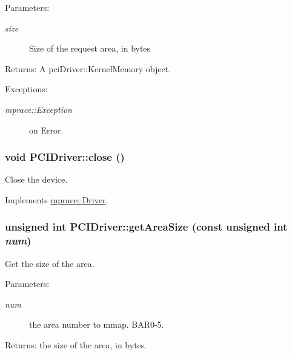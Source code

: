 \begin{Desc}
\item[Parameters:]
\begin{description}
\item[{\em size}]Size of the request area, in bytes \end{description}
\end{Desc}
\begin{Desc}
\item[Returns:]A pci\-Driver::Kernel\-Memory object. \end{Desc}
\begin{Desc}
\item[Exceptions:]
\begin{description}
\item[{\em mprace::Exception}]on Error.\end{description}
\end{Desc}
\hypertarget{classmprace_1_1PCIDriver_a3}{
\subsubsection[close]{\setlength{\rightskip}{0pt plus 5cm}void PCIDriver::close ()}}
\label{classmprace_1_1PCIDriver_a3}


Close the device. 



Implements \hyperlink{classmprace_1_1Driver_a2}{mprace::Driver}.\hypertarget{classmprace_1_1PCIDriver_a6}{
\subsubsection[getAreaSize]{\setlength{\rightskip}{0pt plus 5cm}unsigned int PCIDriver::get\-Area\-Size (const unsigned int {\em num})}}
\label{classmprace_1_1PCIDriver_a6}


Get the size of the area. 

\begin{Desc}
\item[Parameters:]
\begin{description}
\item[{\em num}]the area number to mmap. BAR0-5. \end{description}
\end{Desc}
\begin{Desc}
\item[Returns:]the size of the area, in bytes.\end{Desc}


